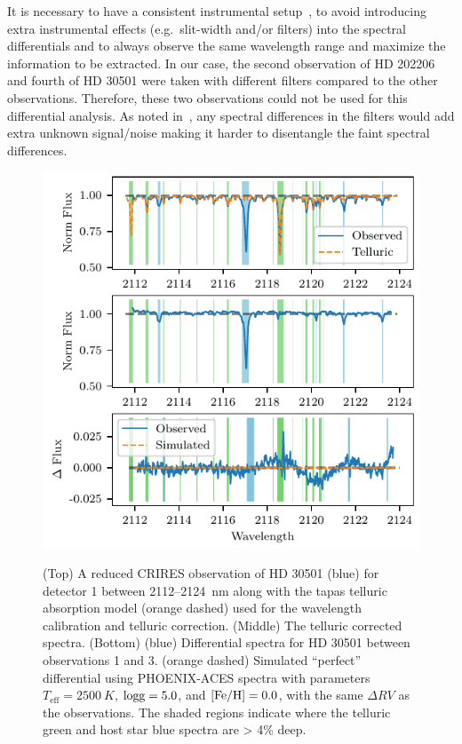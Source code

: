 \documentclass[fleqn,usenatbib]{mnras}
\begin{document}
    It is necessary to have a consistent instrumental setup~\citet{ferluga_separating_1997}, to avoid introducing extra instrumental effects (e.g.\ slit-width and/or filters) into the spectral differentials and to always observe the same wavelength range and maximize the information to be extracted. In our case, the second observation of {HD 202206} and fourth of {HD 30501} were taken with different filters compared to the other observations. Therefore, these two observations could not be used for this differential analysis. As noted in~\citep{hadrava_disentangling_2009}, any spectral differences in the filters would add extra unknown signal/noise making it harder to disentangle the faint spectral differences.
    
    
    \begin{figure}
        \includegraphics[width=\hsize]{images/differential.pdf}\\
        \caption{ (Top) A reduced CRIRES observation of {HD 30501} (blue) for detector 1 between 2112--2124~nm along with the tapas telluric absorption model ({orange} dashed) used for the wavelength calibration and telluric correction. (Middle) The telluric corrected spectra. (Bottom) ({blue}) Differential spectra for {HD 30501} between observations 1 and 3. ({orange} dashed) Simulated ``perfect'' differential using PHOENIX-ACES spectra with parameters \(T_{\textrm{eff}} = 2500~K \), \(\rm logg=5.0\), and \(\rm [Fe/H]=0.0 \), with the same \(\Delta RV \) as the observations. The shaded regions indicate where the telluric {green} and host star {blue} spectra are > 4\% deep.}
        \label{fig:spectral_example}
    \end{figure}
    
\end{document}

